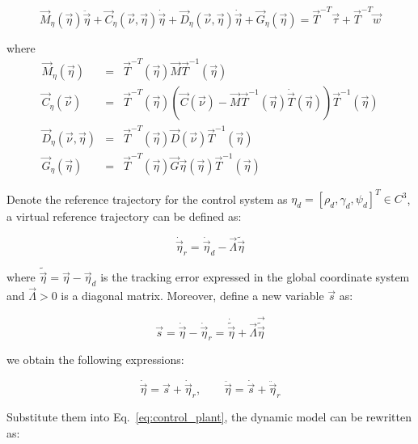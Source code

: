 \begin{sloppypar}
\begin{equation} \label{eq:control_plant}
\vec{M}_{\eta}(\vec{\eta})\ddot{\vec{\eta}} + \vec{C}_{\eta}(\vec{\nu}, \vec{\eta})\dot{\vec{\eta}} + \vec{D}_{\eta}(\vec{\nu}, \vec{\eta})\dot{\vec{\eta}} + \vec{G}_{\eta}(\vec{\eta}) = \vec{T}^{-T}\vec{\tau} + \vec{T}^{-T}\vec{w}
\end{equation}

\noindent where 
\begin{eqnarray}
\vec{M}_{\eta}(\vec{\eta}) &=& \vec{T}^{-T}(\vec{\eta})\vec{M}\vec{T}^{-1}(\vec{\eta}) \\
\vec{C}_{\eta}(\vec{\nu}) &=& \vec{T}^{-T}(\vec{\eta})\left( \vec{C}(\vec{\nu}) - \vec{M}\vec{T}^{-1}(\vec{\eta})\dot{\vec{T}}(\vec{\eta}) \right)\vec{T}^{-1}(\vec{\eta}) \\
\vec{D}_{\eta}(\vec{\nu}, \vec{\eta}) &=& \vec{T}^{-T}(\vec{\eta})\vec{D}(\vec{\nu})\vec{T}^{-1}(\vec{\eta}) \\
\vec{G}_{\eta}(\vec{\eta}) &=& \vec{T}^{-T}(\vec{\eta})\vec{G}\vec{\eta}(\vec{\eta})\vec{T}^{-1}(\vec{\eta})
\end{eqnarray}

Denote the reference trajectory for the control system as $\eta_d = [\rho_d, \gamma_d, \psi_d]^T\in C^3$, a virtual reference trajectory can be defined as:

\begin{equation}
\dot{\vec{\eta}}_r = \dot{\vec{\eta}}_d - \vec{\Lambda}\widetilde{\vec{\eta}}
\end{equation}

\noindent where $\widetilde{\vec{\eta}}=\vec{\eta}-\vec{\eta}_d$ is the tracking error expressed in the global coordinate system and $\vec{\Lambda} > 0$ is a diagonal matrix. Moreover, define a new variable $\vec{s}$ as:

\begin{equation}
\vec{s} = \dot{\vec{\eta}} - \dot{\vec{\eta}}_r = \dot{\widetilde{\vec{\eta}}} + \vec{\Lambda}\vec{\widetilde{\vec{\eta}}}
\end{equation}

\noindent we obtain the following expressions:

\begin{equation}
\dot{\vec{\eta}} = \vec{s} + \dot{\vec{\eta}}_r,\qquad \ddot{\vec{\eta}} = \dot{\vec{s}} + \ddot{\vec{\eta}}_r
\end{equation}

\noindent Substitute them into Eq.~\ref{eq:control_plant}, the dynamic model can be rewritten as:


\end{sloppypar}
